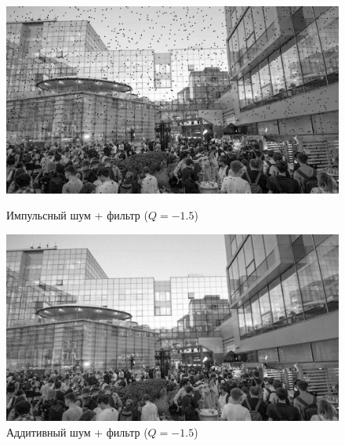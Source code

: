 \documentclass[a4paper]{article}
\begin{document}
\begin{figure}[H]
    \begin{minipage}{0.49\textwidth}
        \centering \includegraphics[width=\textwidth]{images/2_low_filters/impulse - contrharmonic (Q=-1.5).jpg}
        \caption{Импульсный шум + фильтр ($Q = -1.5$)}
    \end{minipage}\hfill
    \begin{minipage}{0.49\textwidth}
        \centering \includegraphics[width=\textwidth]{images/2_low_filters/additive - contrharmonic (Q=-1.5).jpg}
        \caption{Аддитивный шум + фильтр ($Q = -1.5$)}
    \end{minipage}
\end{figure}
\end{document}
